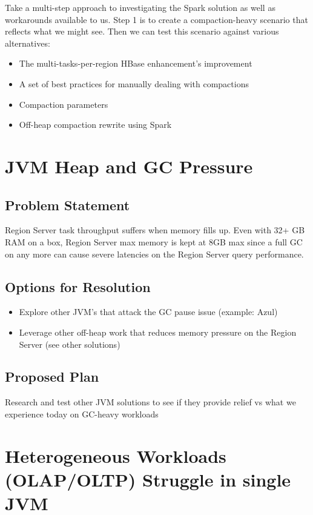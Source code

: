 \documentclass{article}
\begin{document}
Take a multi-step approach to investigating the Spark solution as well as workarounds available to us.  Step 1 is to create a compaction-heavy scenario that reflects what we might see.  Then we can test this scenario against various alternatives:

\begin{itemize}
	\item The multi-tasks-per-region HBase enhancement's improvement
	\item A set of best practices for manually dealing with compactions
	\item Compaction parameters
	\item Off-heap compaction rewrite using Spark
\end{itemize}

\section{JVM Heap and GC Pressure}

\subsection{Problem Statement}

Region Server task throughput suffers when memory fills up.  Even with 32+ GB RAM on a box, Region Server max memory is kept at 8GB max since a full GC on any more can cause severe latencies on the Region Server query performance.

\subsection{Options for Resolution}

\begin{itemize}
	\item Explore other JVM's that attack the GC pause issue (example: Azul)
	\item Leverage other off-heap work that reduces memory pressure on the Region Server (see other solutions)
\end{itemize}

\subsection{Proposed Plan}

Research and test other JVM solutions to see if they provide relief  vs what we experience today on GC-heavy workloads

\section{Heterogeneous Workloads (OLAP/OLTP) Struggle in single JVM}
\end{document}
